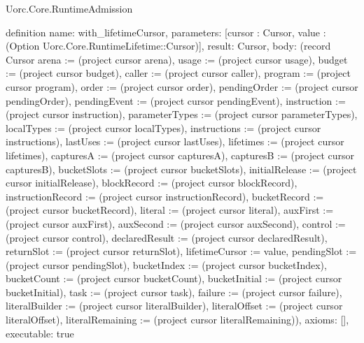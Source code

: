 \begin{lexlean}{Uorc.Core.RuntimeAdmission}
\begin{semanticmodule}
definition{
  name: with_lifetimeCursor,
  parameters: [cursor : Cursor, value : (Option Uorc.Core.RuntimeLifetime::Cursor)],
  result: Cursor,
  body: (record Cursor {arena := (project cursor arena), usage := (project cursor usage), budget := (project cursor budget), caller := (project cursor caller), program := (project cursor program), order := (project cursor order), pendingOrder := (project cursor pendingOrder), pendingEvent := (project cursor pendingEvent), instruction := (project cursor instruction), parameterTypes := (project cursor parameterTypes), localTypes := (project cursor localTypes), instructions := (project cursor instructions), lastUses := (project cursor lastUses), lifetimes := (project cursor lifetimes), capturesA := (project cursor capturesA), capturesB := (project cursor capturesB), bucketSlots := (project cursor bucketSlots), initialRelease := (project cursor initialRelease), blockRecord := (project cursor blockRecord), instructionRecord := (project cursor instructionRecord), bucketRecord := (project cursor bucketRecord), literal := (project cursor literal), auxFirst := (project cursor auxFirst), auxSecond := (project cursor auxSecond), control := (project cursor control), declaredResult := (project cursor declaredResult), returnSlot := (project cursor returnSlot), lifetimeCursor := value, pendingSlot := (project cursor pendingSlot), bucketIndex := (project cursor bucketIndex), bucketCount := (project cursor bucketCount), bucketInitial := (project cursor bucketInitial), task := (project cursor task), failure := (project cursor failure), literalBuilder := (project cursor literalBuilder), literalOffset := (project cursor literalOffset), literalRemaining := (project cursor literalRemaining)}),
  axioms: [],
  executable: true
}


\end{semanticmodule}
\end{lexlean}
